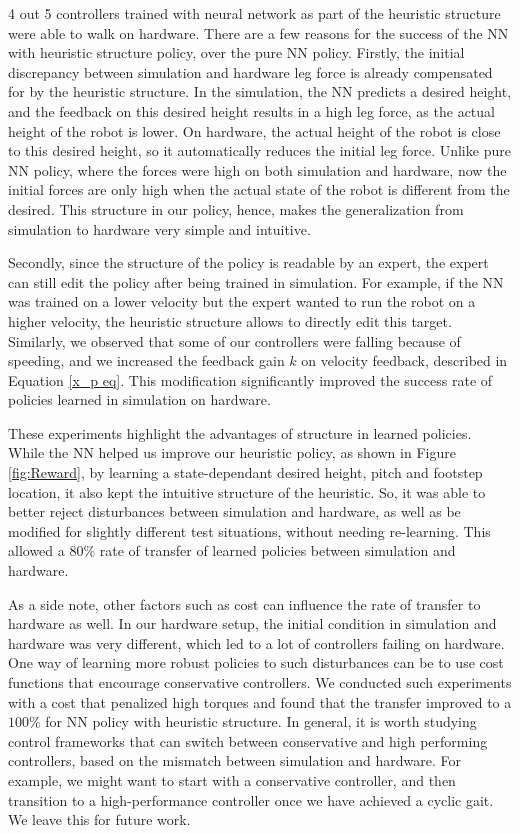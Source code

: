 4 out 5 controllers trained with neural network as part of the heuristic structure were able to walk on hardware. There are a few reasons for the success of the NN with heuristic structure policy, over the pure NN policy. Firstly, the initial discrepancy between simulation and hardware leg force is already compensated for by the heuristic structure. In the simulation, the NN predicts a desired height, and the feedback on this desired height results in a high leg force, as the actual height of the robot is lower. On hardware, the actual height of the robot is close to this desired height, so it automatically reduces the initial leg force. Unlike pure NN policy, where the forces were high on both simulation and hardware, now the initial forces are only high when the actual state of the robot is different from the desired. This structure in our policy, hence, makes the generalization from simulation to hardware very simple and intuitive.

Secondly, since the structure of the policy is readable by an expert, the expert can still edit the policy after being trained in simulation. For example, if the NN was trained on a lower velocity but the expert wanted to run the robot on a higher velocity, the heuristic structure allows to directly edit this target. Similarly, we observed that some of our controllers were falling because of speeding, and we increased the feedback gain $k$ on velocity feedback, described in Equation \ref{x_p eq}. This modification significantly improved the success rate of policies learned in simulation on hardware.

These experiments highlight the advantages of structure in learned policies. While the NN helped us improve our heuristic policy, as shown in Figure \ref{fig:Reward}, by learning a state-dependant desired height, pitch and footstep location, it also kept the intuitive structure of the heuristic. So, it was able to better reject disturbances between simulation and hardware, as well as be modified for slightly different test situations, without needing re-learning. This allowed a \textbf{$80\%$} rate of transfer of learned policies between simulation and hardware.


As a side note, other factors such as cost can influence the rate of transfer to hardware as well. In our hardware setup, the initial condition in simulation and hardware was very different, which led to a lot of controllers failing on hardware. One way of learning more robust policies to such disturbances can be to use cost functions that encourage conservative controllers. We conducted such experiments with a cost that penalized high torques and found that the transfer improved to a $100\%$ for NN policy with heuristic structure. In general, it is worth studying control frameworks that can switch between conservative and high performing controllers, based on the mismatch between simulation and hardware. For example, we might want to start with a conservative controller, and then transition to a high-performance controller once we have achieved a cyclic gait. We leave this for future work.